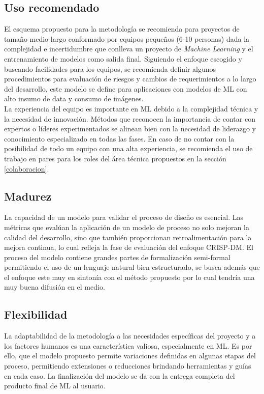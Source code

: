 \documentclass[journal]{IEEEtran}
\begin{document}
\subsection{Uso recomendado}

El esquema propuesto para la metodología se recomienda para proyectos de tamaño medio-largo conformado por equipos pequeños (6-10 personas) dada la complejidad e incertidumbre que conlleva un proyecto de \textit{Machine Learning} y el entrenamiento de modelos como salida final. Siguiendo el enfoque escogido y buscando facilidades para los equipos, se recomienda definir algunos procedimientos para evaluación de riesgos y cambios de requerimientos a lo largo del desarrollo, este modelo se define para aplicaciones con modelos de ML con alto insumo de data y consumo de imágenes.\\

La experiencia del equipo es importante en ML debido a la complejidad técnica y la necesidad de innovación. Métodos que reconocen la importancia de contar con expertos o líderes experimentados se alinean bien con la necesidad de liderazgo y conocimiento especializado en todas las fases. En caso de no contar con la posibilidad de todo un equipo con una alta experiencia, se recomienda el uso de trabajo en pares para los roles del área técnica propuestos en la sección \ref{colaboracion}.\\

\subsection{Madurez}

La capacidad de un modelo para validar el proceso de diseño es esencial. Las métricas que evalúan la aplicación de un modelo de proceso no solo mejoran la calidad del desarrollo, sino que también proporcionan retroalimentación para la mejora continua, lo cual refleja la fase de evaluación del enfoque CRISP-DM. El proceso del modelo contiene grandes partes de formalización semi-formal permitiendo el uso de un lenguaje natural bien estructurado, se busca además que el enfoque este muy en sintonía con el método propuesto por lo cual tendría una muy buena difusión en el medio.\\

\subsection{Flexibilidad}

La adaptabilidad de la metodología a las necesidades específicas del proyecto y a los factores humanos es una característica valiosa, especialmente en ML. Es por ello, que el modelo propuesto permite variaciones definidas en algunas etapas del proceso, permitiendo extensiones o reducciones brindando herramientas y guías en cada caso. La finalización del modelo se da con la entrega completa del producto final de ML al usuario.\\
\end{document}
